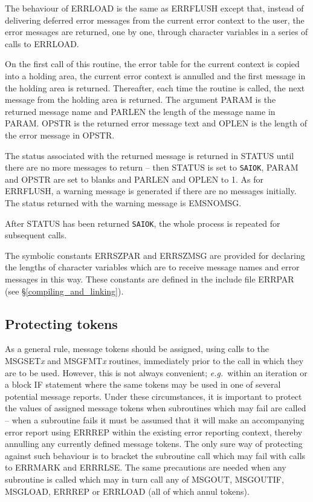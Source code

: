 \documentclass[twoside,11pt]{article}
\newcommand{\htmlref}[2]{#1}
\newcommand{\latex}[1]{#1}
\newcommand{\xlabel}[1]{}
\renewcommand{\_}{\texttt{\symbol{95}}}
\newcommand{\const}[1]{\texttt{#1}}
\newcommand{\saiok}{\const{SAI\_\_OK}}
\begin{document}
The behaviour of ERR\_LOAD is the same as ERR\_FLUSH except that, instead of
delivering deferred error messages from the current error context to the
user, the error messages are returned, one by one, through character variables
in a series of calls to ERR\_LOAD.

On the first call of this routine, the error table for the current
context is copied into a holding area, the current error context
is annulled and the first message in the holding area is returned.
Thereafter, each time the routine is called, the next message from
the holding area is returned.
The argument PARAM is the returned message name and PARLEN the length of the
message name in PARAM.
OPSTR is the returned error message text and OPLEN is the length of
the error message in OPSTR.

The status associated with the returned message is returned in STATUS
until there are no more messages to return -- then STATUS is set to
\saiok, PARAM and OPSTR are set to blanks and PARLEN and OPLEN to 1.
As for ERR\_FLUSH, a warning message is generated if there are no messages
initially. The status returned with the warning message is EMS\_\_NOMSG.

After STATUS has been returned \saiok, the whole process is repeated
for subsequent calls.

The symbolic constants ERR\_\_SZPAR and ERR\_\_SZMSG are provided for
declaring the lengths of character variables which are to receive message
names and error messages in this way.
These constants are defined in the include file
\htmlref
{ERR\_PAR}{compiling_and_linking}\latex{ (see \S\ref{compiling_and_linking})}.

\subsection{\xlabel{protecting_tokens}Protecting tokens}
As a general rule, message tokens should be assigned, using calls to the
MSG\_SET\textit{x} and MSG\_FMT\textit{x} routines, immediately prior to the call
in which they are to be used.
However, this is not always convenient; \textit{e.g.}\ within an iteration
or a block IF statement where the same tokens may be used in one of several
potential message reports.
Under these circumstances, it is important to protect the values of assigned
message tokens when subroutines which may fail are called -- when a subroutine
fails it must be assumed that it will make an accompanying error report
using ERR\_REP within the existing error reporting context, thereby annulling
any currently defined message tokens.
The only sure way of protecting against such behaviour is to bracket the
subroutine call which may fail with calls to ERR\_MARK and ERR\_RLSE.
The same precautions are needed when any subroutine is called which
may in turn call any of MSG\_OUT, MSG\_OUTIF, MSG\_LOAD, ERR\_REP or ERR\_LOAD
(all of which annul tokens).
\end{document}
